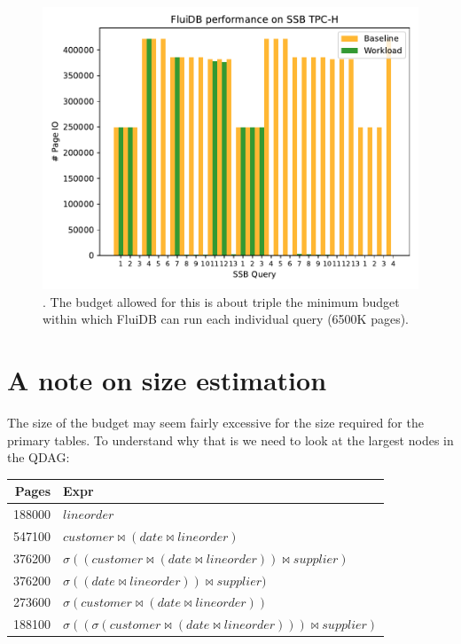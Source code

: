 \begin{figure}[p]
\centering
\includegraphics[width=.9\linewidth]{./plans/io_perf_65000.pdf}

\caption{\label{fig:extra_large_budget_plot}
\ioperfdescr. The budget
  allowed for this is about triple the minimum budget within which
  FluiDB can run each individual query (6500K pages).}
\end{figure}

\section{A note on size estimation}
\label{sec:size_estimation_problems}
The size of the budget may seem fairly excessive for the size required
for the primary tables. To understand why that is we need to look at
the largest nodes in the QDAG:

\begin{center}
\begin{tabular}{rl}
Pages & Expr\\
\hline
188000 & \(lineorder\)\\
547100 & \(customer \Join (date \Join lineorder)\)\\
376200 & \(\sigma ((customer \Join (date \Join lineorder)) \Join supplier)\)\\
376200 & \(\sigma ((date \Join lineorder)) \Join supplier)\)\\
273600 & \(\sigma (customer \Join (date \Join lineorder))\)\\
188100 & \(\sigma ((\sigma (customer \Join (date \Join lineorder))) \Join supplier)\)\\
\end{tabular}
\end{center}

